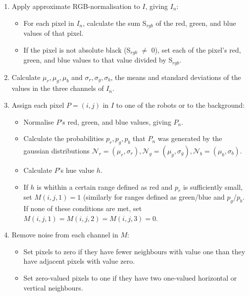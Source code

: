 \documentclass[10pt,a4paper]{article}
\begin{document}
\begin{enumerate}
    \item
    Apply approximate RGB-normalisation to $I$, giving $I_n$:
    \begin{itemize}
        \item
        For each pixel in $I_n$, calculate the sum S$_{rgb}$ of the red, green, 
        and blue values of that pixel.
        \item
        If the pixel is not absolute black (S$_{rgb}$ $\ne$ 0), set each of the 
        pixel's red, green, and blue values to that value divided by S$_{rgb}$.
    \end{itemize}

    \item
    Calculate $\mu_r, \mu_g, \mu_b$ and $\sigma_r, \sigma_g, \sigma_b$, the 
    means and standard deviations of the values in the three channels of $I_n$.

    \item
    Assign each pixel $P = (i,j)$ in $I$ to one of the robots or to the 
    background:
    \begin{itemize}
        \item
        Normalise $P$'s red, green, and blue values, giving $P_n$.
        \item
        Calculate the probabilities $p_r, p_g, p_b$ that $P_n$ was generated 
        by the gaussian distributions $\mathcal{N}_r = (\mu_r, \sigma_r),
        \mathcal{N}_g = (\mu_g, \sigma_g), \mathcal{N}_b = (\mu_b, \sigma_b)$.
        \item
        Calculate $P$'s hue value $h$.
        \item
        If $h$ is whithin a certain range defined as red and $p_r$ is
        sufficiently small, set $M(i,j,1) = 1$ (similarly for ranges defined as
        green/blue and $p_g$/$p_b$. If none of these conditions are met, set
        $M(i,j,1) = M(i,j,2) = M(i,j,3) = 0$.
    \end{itemize}

    \item
    Remove noise from each channel in $M$:
    \begin{itemize}
        \item
        Set pixels to zero if they have fewer neighbours with value one than
        they have adjacent pixels with value zero.
        \item
        Set zero-valued pixels to one if they have two one-valued 
        horizontal or vertical neighbours.
    \end{itemize}


\end{enumerate}
\end{document}
